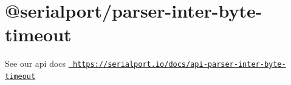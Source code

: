 \chapter{@serialport/parser-\/inter-\/byte-\/timeout}
\hypertarget{md_Dashboard_2node__modules_2_0dserialport_2parser-inter-byte-timeout_2README}{}\label{md_Dashboard_2node__modules_2_0dserialport_2parser-inter-byte-timeout_2README}
\label{md_Dashboard_2node__modules_2_0dserialport_2parser-inter-byte-timeout_2README_autotoc_md86}%
%
 See our api docs \href{https://serialport.io/docs/api-parser-inter-byte-timeout}{\texttt{ https\+://serialport.\+io/docs/api-\/parser-\/inter-\/byte-\/timeout}} 